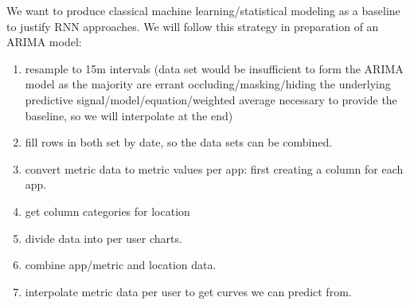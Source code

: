 \documentclass[11pt]{article}
\providecommand{\tightlist}{%
      \setlength{\itemsep}{0pt}\setlength{\parskip}{0pt}}
\begin{document}
    We want to produce classical machine learning/statistical modeling as a
baseline to justify RNN approaches. We will follow this strategy in
preparation of an ARIMA model:

\begin{enumerate}
\def\labelenumi{\arabic{enumi}.}
\setcounter{enumi}{-1}
\tightlist
\item
  resample to 15m intervals (data set would be insufficient to form the
  ARIMA model as the majority are errant occluding/masking/hiding the
  underlying predictive signal/model/equation/weighted average necessary
  to provide the baseline, so we will interpolate at the end)
\item
  fill rows in both set by date, so the data sets can be combined.
\item
  convert metric data to metric values per app: first creating a column
  for each app.
\item
  get column categories for location
\item
  divide data into per user charts.
\item
  combine app/metric and location data.
\item
  interpolate metric data per user to get curves we can predict from.
\end{enumerate}
\end{document}
